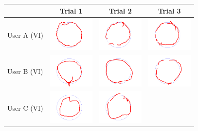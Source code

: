 \begin{tabular}{lccc}
\toprule
 & Trial 1 & Trial 2 & Trial 3\\
\midrule
 User A (VI)&
\includegraphics[width=2.3cm]{../experiments/circle_Ayaka5_0.png} &
\includegraphics[width=2.3cm]{../experiments/circle_Ayaka5_1.png} &
\includegraphics[width=2.3cm]{../experiments/circle_Ayaka5_2.png} \\
\midrule
 User B (VI)&
\includegraphics[width=2.3cm]{../experiments/circle_Takeyo_0.png} &
\includegraphics[width=2.3cm]{../experiments/circle_Takeyo_1.png} &
\includegraphics[width=2.3cm]{../experiments/circle_Takeyo_2.png} \\
\midrule
 User C (VI)&
\includegraphics[width=2.3cm]{../experiments/circle_Angus_0.png} &
\includegraphics[width=2.3cm]{../experiments/circle_Angus_1.png} &

\end{tabular}
